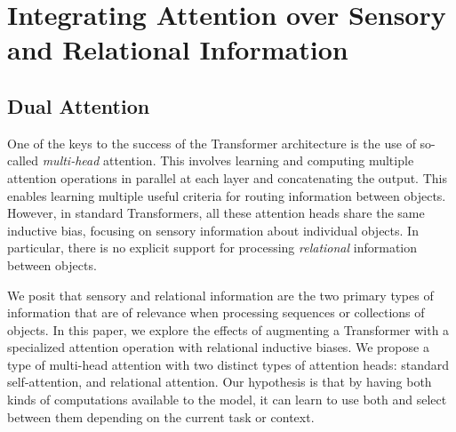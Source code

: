 \section{Integrating Attention over Sensory and Relational Information}

\subsection{Dual Attention}

One of the keys to the success of the Transformer architecture is the use of so-called \textit{multi-head} attention. This involves learning and computing multiple attention operations in parallel at each layer and concatenating the output. This enables learning multiple useful criteria for routing information between objects. However, in standard Transformers, all these attention heads share the same inductive bias, focusing on sensory information about individual objects. 
In particular, there is no explicit support for processing \textit{relational} information between objects.

We posit that sensory and relational information are the two primary types of information that are of relevance when processing sequences or collections of objects. 
In this paper, we explore the effects of augmenting a Transformer with a specialized attention operation with relational inductive biases. We propose a type of multi-head attention with two distinct types of attention heads: standard self-attention, and relational attention. Our hypothesis is that by having both kinds of computations available to the model, it can learn to use both and select between them depending on the current task or context.

